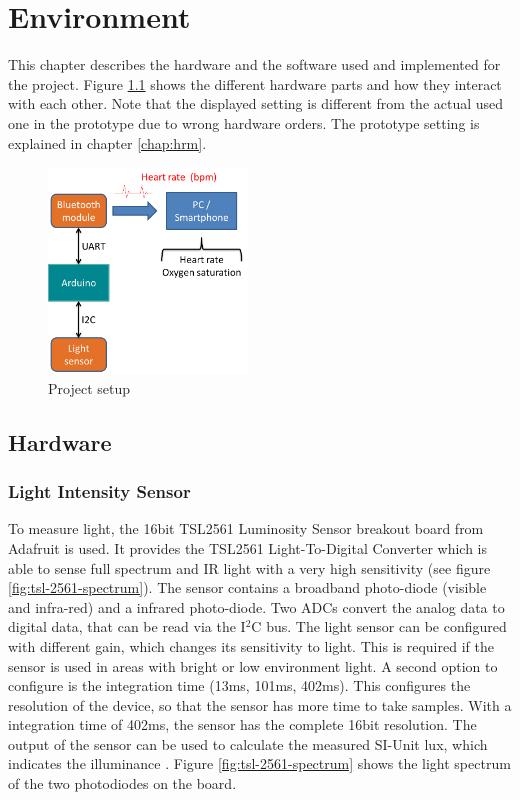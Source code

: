 \documentclass[notitlepage]{scrreprt}
\begin{document}
\chapter{Environment}
\label{chap:environment}
This chapter describes the hardware and the software used and implemented for the project. Figure \ref{fig:data-flow} shows the different hardware parts and how they interact with each other. Note that the displayed setting is different from the actual used one in the prototype due to wrong hardware orders. The prototype setting is explained in chapter \ref{chap:hrm}.

\begin{figure}[H]
	\centering
	\includegraphics[width=200px]{images/general_dataFlow.png}
	\caption{Project setup}
	\label{fig:data-flow}
\end{figure}

\section{Hardware}
\subsection{Light Intensity Sensor}
To measure light, the 16bit TSL2561 Luminosity Sensor breakout board from Adafruit is used. It provides the TSL2561 Light-To-Digital Converter which is able to sense full spectrum and IR light with a very high sensitivity (see figure \ref{fig:tsl-2561-spectrum}). The sensor contains a broadband photo-diode (visible and infra-red) and a infrared photo-diode. Two ADCs convert the analog data to digital data, that can be read via the I$^{2}$C bus. The light sensor can be configured with different gain, which changes its sensitivity to light. This is required if the sensor is used in areas with bright or low environment light. A second option to configure is the integration time (13ms, 101ms, 402ms). This configures the resolution of the device, so that the sensor has more time to take samples. With a integration time of 402ms, the sensor has the complete 16bit resolution. The output of the sensor can be used to calculate the measured SI-Unit lux, which indicates the illuminance \cite{bib:tsl-sensor}. Figure \ref{fig:tsl-2561-spectrum} shows the light spectrum of the two photodiodes on the board.
\end{document}
